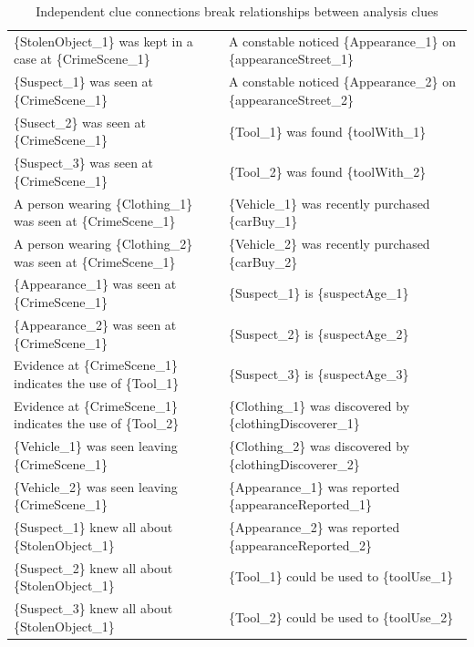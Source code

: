 \documentclass{article}
\begin{document}
\begin{landscape}
 
\begin{table}[]
\caption {Independent clue connections break relationships between analysis clues} \label{tab:indep_edges} 
\begin{tabular}{ll}
\{StolenObject\_1\}   was kept in a case at \{CrimeScene\_1\} & A constable noticed   \{Appearance\_1\} on \{appearanceStreet\_1\} \\
\{Suspect\_1\}   was seen at \{CrimeScene\_1\} & A constable noticed   \{Appearance\_2\} on \{appearanceStreet\_2\} \\
\{Susect\_2\}   was seen at \{CrimeScene\_1\} & \{Tool\_1\} was found \{toolWith\_1\} \\
\{Suspect\_3\}   was seen at \{CrimeScene\_1\} & \{Tool\_2\} was found \{toolWith\_2\} \\
A person   wearing \{Clothing\_1\} was seen at \{CrimeScene\_1\} & \{Vehicle\_1\} was recently   purchased \{carBuy\_1\} \\
A person   wearing \{Clothing\_2\} was seen at \{CrimeScene\_1\} & \{Vehicle\_2\} was recently   purchased \{carBuy\_2\} \\
\{Appearance\_1\}   was seen at \{CrimeScene\_1\} & \{Suspect\_1\} is \{suspectAge\_1\} \\
\{Appearance\_2\}   was seen at \{CrimeScene\_1\} & \{Suspect\_2\} is \{suspectAge\_2\} \\
Evidence   at \{CrimeScene\_1\} indicates the use of \{Tool\_1\} & \{Suspect\_3\} is \{suspectAge\_3\} \\
Evidence   at \{CrimeScene\_1\} indicates the use of \{Tool\_2\} & \{Clothing\_1\} was discovered by   \{clothingDiscoverer\_1\} \\
\{Vehicle\_1\}   was seen leaving \{CrimeScene\_1\} & \{Clothing\_2\} was discovered by   \{clothingDiscoverer\_2\} \\
\{Vehicle\_2\}   was seen leaving \{CrimeScene\_1\} & \{Appearance\_1\} was reported   \{appearanceReported\_1\} \\
\{Suspect\_1\}   knew all about \{StolenObject\_1\} & \{Appearance\_2\} was reported   \{appearanceReported\_2\} \\
\{Suspect\_2\}   knew all about \{StolenObject\_1\} & \{Tool\_1\} could be used to   \{toolUse\_1\} \\
\{Suspect\_3\}   knew all about \{StolenObject\_1\} & \{Tool\_2\} could be used to   \{toolUse\_2\} \\

\end{tabular}
\end{table}
\end{landscape}
\end{document}
